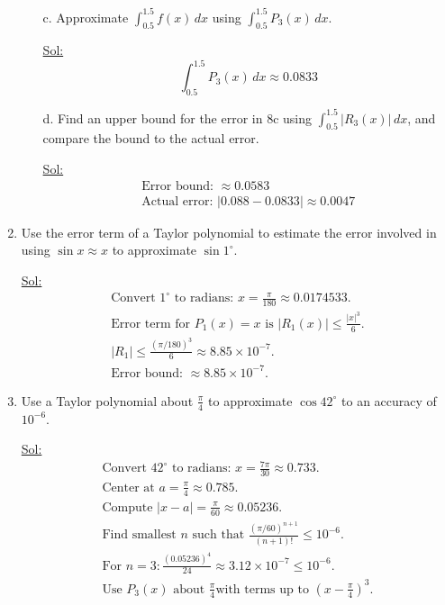\begin{enumerate}
\begin{itemize}
    \item[c.] Approximate \( \int_{0.5}^{1.5} f(x) \, dx \) using \(
      \int_{0.5}^{1.5} P_3(x) \, dx \).

      \underline{Sol:}\\
      \[
        \int_{0.5}^{1.5} P_3(x) \, dx \approx 0.0833
      \]
      \bigbreak

    \item[d.] Find an upper bound for the error in 8c using \(
      \int_{0.5}^{1.5} |R_3(x)| \, dx \), and compare the bound to
      the actual error.

      \underline{Sol:}\\
      \[
        \begin{array}{l}
          \textrm{Error bound: } \approx 0.0583 \\
          \textrm{Actual error: } |0.088 - 0.0833| \approx 0.0047
        \end{array}
      \]
      \bigbreak
  \end{itemize}

\item Use the error term of a Taylor polynomial to estimate the error
  involved in using \( \sin x \approx x \) to approximate \( \sin 1^\circ \).

  \underline{Sol:}\\
  \[
    \begin{array}{l}
      \textrm{Convert } 1^\circ \textrm{ to radians: } x =
      \frac{\pi}{180} \approx 0.0174533. \\
      \textrm{Error term for } P_1(x) = x \textrm{ is } |R_1(x)| \leq
      \frac{|x|^3}{6}. \\
      |R_1| \leq \frac{(\pi/180)^3}{6} \approx 8.85 \times 10^{-7}. \\
      \textrm{Error bound: } \approx 8.85 \times 10^{-7}.
    \end{array}
  \]
  \bigbreak

\item Use a Taylor polynomial about \( \frac{\pi}{4} \) to
  approximate \( \cos 42^\circ \) to an accuracy of \( 10^{-6} \).

  \underline{Sol:}\\
  \[
    \begin{array}{l}
      \textrm{Convert } 42^\circ \textrm{ to radians: } x =
      \frac{7\pi}{30} \approx 0.733. \\
      \textrm{Center at } a = \frac{\pi}{4} \approx 0.785. \\
      \textrm{Compute } |x - a| = \frac{\pi}{60} \approx 0.05236. \\
      \textrm{Find smallest } n \textrm{ such that }
      \frac{(\pi/60)^{n+1}}{(n+1)!} \leq 10^{-6}. \\
      \textrm{For } n = 3: \frac{(0.05236)^4}{24} \approx 3.12 \times
      10^{-7} \leq 10^{-6}. \\
      \textrm{Use } P_3(x) \textrm{ about } \frac{\pi}{4} \textrm{
      with terms up to } (x - \frac{\pi}{4})^3.
    \end{array}
  \]
  \bigbreak


\end{enumerate}
